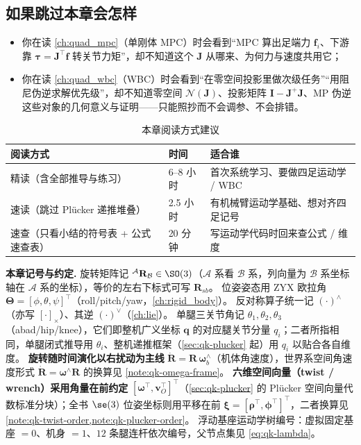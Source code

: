 \subsection*{如果跳过本章会怎样}
\begin{itemize}
  \item 你在读 \cref{ch:quad_mpc}（单刚体 MPC）时会看到“MPC 算出足端力 $\mathbf{f}_i$、下游靠 $\boldsymbol{\tau}=\mathbf{J}^\top\mathbf{f}$ 转关节力矩”，却不知道这个 $\mathbf{J}$ 从哪来、为何力与速度共用它；
  \item 你在读 \cref{ch:quad_wbc}（WBC）时会看到“在零空间投影里做次级任务”“用阻尼伪逆求解优先级”，却不知道零空间 $\mathcal{N}(\mathbf{J})$、投影矩阵 $\mathbf{I}-\mathbf{J}^+\mathbf{J}$、MP 伪逆这些对象的几何意义与证明——只能照抄而不会调参、不会排错。
\end{itemize}

\begin{table}[H]\centering\small
\caption{本章阅读方式建议}
\begin{tabular}{lll}
\toprule
阅读方式 & 时间 & 适合谁 \\
\midrule
精读（含全部推导与练习） & 6--8 小时 & 首次系统学习、要做四足运动学 / WBC \\
速读（跳过 Plücker 递推堆叠） & 2.5 小时 & 有机械臂运动学基础、想对齐四足记号 \\
速查（只看小结的符号表 + 公式速查表） & 20 分钟 & 写运动学代码时回来查公式 / 维度 \\
\bottomrule
\end{tabular}
\end{table}

\begin{note}
\textbf{本章记号与约定.}\;
旋转矩阵记 ${}^{\mathcal{A}}\mathbf{R}_{\mathcal{B}}\in\SO(3)$（$\mathcal{A}$ 系看 $\mathcal{B}$ 系，列向量为 $\mathcal{B}$ 系坐标轴在 $\mathcal{A}$ 系的坐标），等价的左右下标式可写 $\mathbf{R}_{sb}$。
位姿姿态用 ZYX 欧拉角 $\boldsymbol{\Theta}=[\phi,\theta,\psi]^\top$（roll/pitch/yaw，\cref{ch:rigid_body}）。
反对称算子统一记 $(\cdot)^\wedge$（亦写 $[\cdot]_\times$）、其逆 $(\cdot)^\vee$（\cref{ch:lie}）。
单腿三关节角记 $\theta_1,\theta_2,\theta_3$（abad/hip/knee），它们即整机广义坐标 $\boldsymbol{q}$ 的对应腿关节分量 $q_i$；二者所指相同，单腿闭式推导用 $\theta_i$、整机递推框架（\cref{sec:qk-plucker} 起）用 $q_i$ 以贴合各自维度。
\textbf{旋转随时间演化以右扰动为主线} $\dot{\mathbf{R}}=\mathbf{R}\,\boldsymbol{\omega}_b^\wedge$（机体角速度），世界系空间角速度形式 $\dot{\mathbf{R}}=\boldsymbol{\omega}^\wedge\mathbf{R}$ 的换算见 \cref{note:qk-omega-frame}。
\textbf{六维空间向量（twist / wrench）采用角量在前约定} $[\boldsymbol{\omega}^\top,\boldsymbol{v}_O^\top]^\top$（\cref{sec:qk-plucker} 的 Plücker 空间向量代数标准分块）；全书 $\se(3)$ 位姿坐标则用平移在前 $\boldsymbol{\xi}=[\boldsymbol{\rho}^\top,\boldsymbol{\phi}^\top]^\top$，二者换算见 \cref{note:qk-twist-order,note:qk-plucker-order}。
浮动基座运动学树编号：虚拟固定基座 $=0$、机身 $=1$、$12$ 条腿连杆依次编号，父节点集见 \cref{eq:qk-lambda}。
\end{note}

